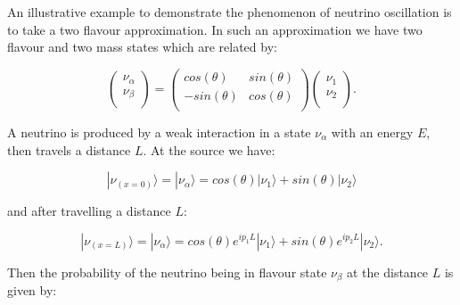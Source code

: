 An illustrative example to demonstrate the phenomenon of neutrino oscillation is to take a two flavour approximation. In such an approximation we have two flavour and two mass states which are related by:

\begin{equation}
  \begin{pmatrix}
    \nu_{\alpha} \\
    \nu_{\beta} \\
  \end{pmatrix}
  =
  \begin{pmatrix}
    cos(\theta) & sin(\theta) \\
    -sin(\theta) & cos(\theta) \\
  \end{pmatrix}
  \begin{pmatrix}
    \nu_{1} \\
    \nu_{2} \\
  \end{pmatrix}.
  \label{eq:particle-physics:neutrino-oscillation-two-flavour}
\end{equation}

\noindent
A neutrino is produced by a weak interaction in a state $\nu_{\alpha}$ with an energy $E$, then travels a distance $L$. At the source we have:

\begin{equation}
  |\nu_{(x=0)} \rangle = |\nu_{\alpha} \rangle = cos(\theta) |\nu_{1}\rangle + sin(\theta) |\nu_{2}\rangle
\end{equation}

\noindent
and after travelling a distance $L$:

\begin{equation}
  |\nu_{(x=L)} \rangle = |\nu_{\alpha} \rangle = cos(\theta) e^{ip_{1}L} |\nu_{1}\rangle + sin(\theta) e^{ip_{2}L} |\nu_{2}\rangle.
\end{equation}

\noindent
Then the probability of the neutrino being in flavour state $\nu_{\beta}$ at the distance $L$ is given by:


